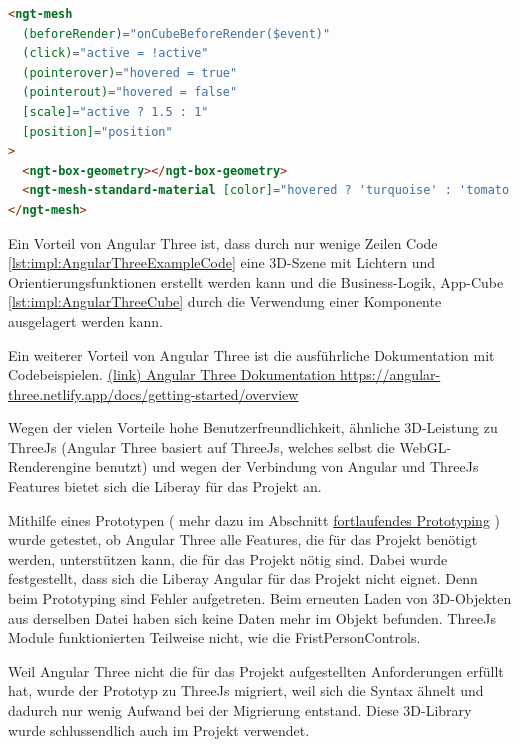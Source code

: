 \begin{lstlisting}[language=html,caption=Angular Three - App Cube,label=lst:impl:AngularThreeCube]
<ngt-mesh
  (beforeRender)="onCubeBeforeRender($event)"
  (click)="active = !active"
  (pointerover)="hovered = true"
  (pointerout)="hovered = false"
  [scale]="active ? 1.5 : 1"
  [position]="position"
>
  <ngt-box-geometry></ngt-box-geometry>
  <ngt-mesh-standard-material [color]="hovered ? 'turquoise' : 'tomato'"></ngt-mesh-standard-material>
</ngt-mesh>
\end{lstlisting}
Ein Vorteil von Angular Three ist, dass durch nur wenige Zeilen Code \ref{lst:impl:AngularThreeExampleCode} eine 3D-Szene mit Lichtern und Orientierungsfunktionen erstellt werden kann und die Business-Logik, App-Cube \ref{lst:impl:AngularThreeCube} durch die Verwendung einer Komponente ausgelagert werden kann.

Ein weiterer Vorteil von Angular Three ist die ausführliche Dokumentation mit Codebeispielen. \href{https://angular-three.netlify.app/docs/getting-started/overview}{(link) Angular Three Dokumentation https://angular-three.netlify.app/docs/getting-started/overview}

Wegen der vielen Vorteile hohe Benutzerfreundlichkeit, ähnliche 3D-Leistung zu ThreeJs (Angular Three basiert auf ThreeJs, welches selbst die WebGL-Renderengine benutzt) und wegen der Verbindung von Angular und ThreeJs Features bietet sich die Liberay für das Projekt an.

Mithilfe eines Prototypen ( mehr dazu im Abschnitt \hyperref[ch::ongoing-prototyping]{fortlaufendes Prototyping} ) wurde getestet, ob Angular Three alle Features, die für das Projekt benötigt werden, unterstützen kann, die für das Projekt nötig sind. Dabei wurde festgestellt, dass sich die Liberay Angular für das Projekt nicht eignet. Denn beim Prototyping sind Fehler aufgetreten. Beim erneuten Laden von 3D-Objekten aus derselben Datei haben sich keine Daten mehr im Objekt befunden. ThreeJs Module funktionierten Teilweise nicht, wie die FristPersonControls. 

Weil Angular Three nicht die für das Projekt aufgestellten Anforderungen erfüllt hat, wurde der Prototyp zu ThreeJs migriert, weil sich die Syntax ähnelt und dadurch nur wenig Aufwand bei der Migrierung entstand. Diese 3D-Library wurde schlussendlich auch im Projekt verwendet.